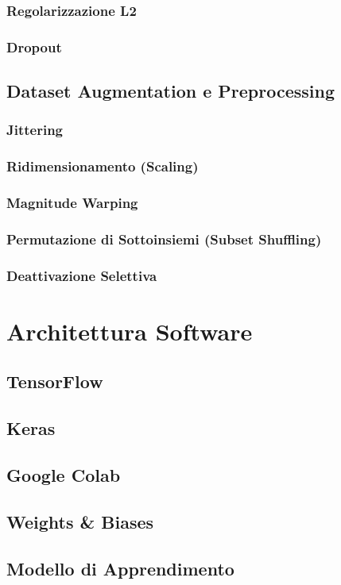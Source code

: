 \documentclass[12pt]{report}
\begin{document}
\subsection{Regolarizzazione L2}
\subsection{Dropout}
\section{Dataset Augmentation e Preprocessing}
\subsection{Jittering}
\subsection{Ridimensionamento (Scaling)}
\subsection{Magnitude Warping}
\subsection{Permutazione di Sottoinsiemi (Subset Shuffling)}
\subsection{Deattivazione Selettiva}


\chapter{Architettura Software}
\section{TensorFlow}
\section{Keras}
\section{Google Colab}
\section{Weights \& Biases}
\section{Modello di Apprendimento}
\end{document}
